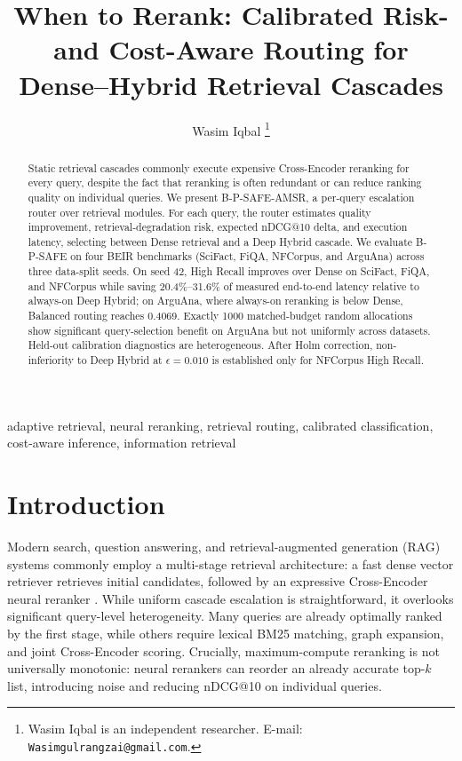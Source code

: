 \documentclass[10pt,journal]{IEEEtran}
\title{When to Rerank: Calibrated Risk- and Cost-Aware Routing for Dense--Hybrid Retrieval Cascades}
\author{Wasim Iqbal%
\thanks{Wasim Iqbal is an independent researcher. E-mail: \texttt{Wasimgulrangzai@gmail.com}.}}
\makeatletter
\newcommand{\ndcg}{nDCG@10}
\makeatother
\begin{document}
\maketitle

\begin{abstract}
Static retrieval cascades commonly execute expensive Cross-Encoder reranking for every query, despite the fact that reranking is often redundant or can reduce ranking quality on individual queries. We present B-P-SAFE-AMSR, a per-query escalation router over retrieval modules. For each query, the router estimates quality improvement, retrieval-degradation risk, expected nDCG@10 delta, and execution latency, selecting between Dense retrieval and a Deep Hybrid cascade. We evaluate B-P-SAFE on four BEIR benchmarks (SciFact, FiQA, NFCorpus, and ArguAna) across three data-split seeds. On seed 42, High Recall improves over Dense on SciFact, FiQA, and NFCorpus while saving 20.4\%--31.6\% of measured end-to-end latency relative to always-on Deep Hybrid; on ArguAna, where always-on reranking is below Dense, Balanced routing reaches 0.4069. Exactly 1000 matched-budget random allocations show significant query-selection benefit on ArguAna but not uniformly across datasets. Held-out calibration diagnostics are heterogeneous. After Holm correction, non-inferiority to Deep Hybrid at $\epsilon=0.010$ is established only for NFCorpus High Recall.
\end{abstract}

\begin{IEEEkeywords}
adaptive retrieval, neural reranking, retrieval routing, calibrated classification, cost-aware inference, information retrieval
\end{IEEEkeywords}

\section{Introduction}
\label{sec:introduction}

Modern search, question answering, and retrieval-augmented generation (RAG) systems commonly employ a multi-stage retrieval architecture: a fast dense vector retriever retrieves initial candidates, followed by an expressive Cross-Encoder neural reranker \cite{karpukhin2020dense,nogueira2019passage}. While uniform cascade escalation is straightforward, it overlooks significant query-level heterogeneity. Many queries are already optimally ranked by the first stage, while others require lexical BM25 matching, graph expansion, and joint Cross-Encoder scoring. Crucially, maximum-compute reranking is not universally monotonic: neural rerankers can reorder an already accurate top-$k$ list, introducing noise and reducing \ndcg{} on individual queries.
\end{document}
